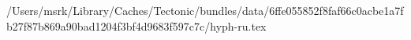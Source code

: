 /Users/msrk/Library/Caches/Tectonic/bundles/data/6ffe055852f8faf66c0acbe1a7fb27f87b869a90bad1204f3bf4d9683f597c7c/hyph-ru.tex